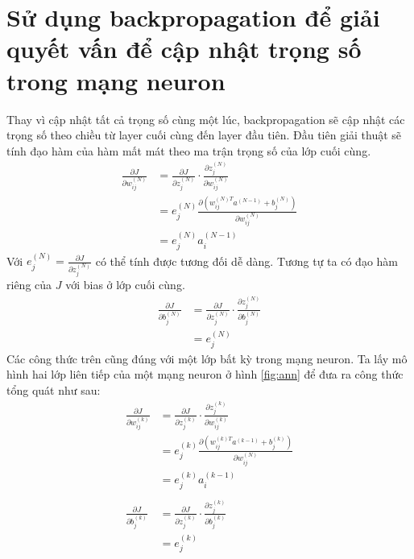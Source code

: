 \section{Sử dụng backpropagation để giải quyết vấn để cập nhật trọng số trong mạng neuron}
Thay vì cập nhật tất cả trọng số cùng một lúc, backpropagation\cite[p.220-226]{tiep:2017} sẽ cập nhật các trọng số theo chiều từ layer cuối cùng đến layer đầu tiên. Đầu tiên giải thuật sẽ tính đạo hàm của hàm mất mát theo ma trận trọng số của lớp cuối cùng.
\begin{align*}
	\frac
		{ {\partial} J }
		{ {\partial} {w_{ij}^{(N)}} }
	&=
	\frac
		{ {\partial} J }
		{ {\partial} {z_{j}^{(N)}} }
	{\cdot}
	\frac
		{ {\partial} {z_{j}^{(N)}} }
		{ {\partial} {w_{ij}^{(N)}} } \\
	&=
	{e_{j}^{(N)}}
	{
		\frac
			{ {\partial} \left(
							{w_{ij}^{(N)T}}
							a^{(N-1)}
							+
							{b_{j}^{(N)}}
						 \right)
			}
			{ {\partial} {w_{ij}^{(N)}} }
	}\\
	&={e_{j}^{(N)}}{a_{i}^{(N-1)}}
\end{align*}
Với ${e_{j}^{(N)}}=\frac{{\partial}J}{{\partial}{z_{j}^{(N)}}}$ có thể tính được tương đối dễ dàng. Tương tự ta có đạo hàm riêng của $J$ với bias ở lớp cuối cùng.
\begin{align*}
	\frac
		{ {\partial} J }
		{ {\partial} {b_{j}^{(N)}} }
	&=
	\frac
		{ {\partial} J }
		{ {\partial} {z_{j}^{(N)}} }
	{\cdot}
	\frac
		{ {\partial} {z_{j}^{(N)}} }
		{ {\partial} {b_{j}^{(N)}} } \\
	&={e_{j}^{(N)}}
\end{align*}
Các công thức trên cũng đúng với một lớp bất kỳ trong mạng neuron. Ta lấy mô hình hai lớp liên tiếp của một mạng neuron ở hình \ref{fig:ann} để đưa ra công thức tổng quát như sau:
\begin{align*}
	\frac
		{ {\partial} J }
		{ {\partial} {w_{ij}^{(k)}} }
	&=
	\frac
		{ {\partial} J }
		{ {\partial} {z_{j}^{(k)}} }
	{\cdot}
	\frac
		{ {\partial} {z_{j}^{(k)}} }
		{ {\partial} {w_{ij}^{(k)}} } \\
	&=
	{e_{j}^{(k)}}
	\frac
		{ {\partial} \left(
						{w_{ij}^{(k)T}}
						a^{(k-1)}
						+
						{b_{j}^{(k)}}
					 \right)
		}
		{ {\partial} {w_{ij}^{(N)}} } \\
	&={e_{j}^{(k)}}{a_{i}^{(k-1)}} \\ \\
	\frac
		{ {\partial} J }
		{ {\partial} {b_{j}^{(k)}} }
	&=
	\frac
		{ {\partial} J }
		{ {\partial} {z_{j}^{(k)}} }
	{\cdot}
	\frac
		{ {\partial} {z_{j}^{(k)}} }
		{ {\partial} {b_{j}^{(k)}} } \\
	&={e_{j}^{(k)}}
\end{align*}
